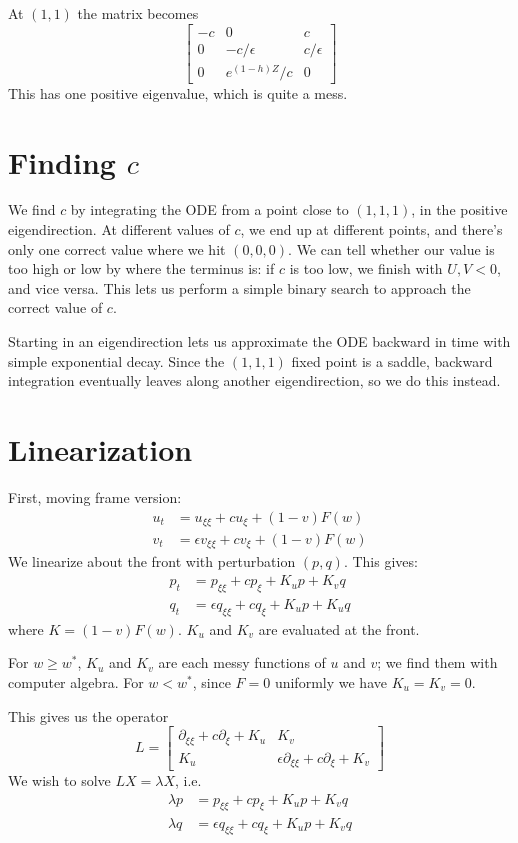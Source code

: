 \documentclass[10pt]{article}
\begin{document}
At $(1,1)$ the matrix becomes
\[
\begin{bmatrix}
-c & 0 & c \\
0 & -c/\epsilon & c/\epsilon \\
0 & e^{(1-h)Z}/c & 0
\end{bmatrix}
\]
This has one positive eigenvalue, which is quite a mess.


\section{Finding $c$}
We find $c$ by integrating the ODE from a point close to $(1,1,1)$, in the positive eigendirection.
At different values of $c$, we end up at different points, and there's only one correct value where we hit $(0,0,0)$.
We can tell whether our value is too high or low by where the terminus is: if $c$ is too low, we finish with $U,V < 0$, and vice versa.  This lets us perform a simple binary search to approach the correct value of $c$.

Starting in an eigendirection lets us approximate the ODE backward in time with simple exponential decay.
Since the $(1,1,1)$ fixed point is a saddle, backward integration eventually leaves along another eigendirection, so we do this instead.


\section{Linearization}
First, moving frame version:
\begin{align}
u_t &= u_{\xi\xi} + c u_\xi + (1-v)F(w) \\
v_t &= \epsilon v_{\xi\xi} + c v_\xi+ (1-v)F(w)
\end{align}
We linearize about the front with perturbation $(p,q)$.  This gives:
\begin{align}
p_t &= p_{\xi\xi} + c p_\xi + K_u p + K_v q \\
q_t &= \epsilon q_{\xi\xi} + c q_\xi+ K_u p + K_u q
\end{align}
where $K = (1-v)F(w)$.
$K_u$ and $K_v$ are evaluated at the front.

For $w \geq w^*$, $K_u$ and $K_v$ are each messy functions of $u$ and $v$; we find them with computer algebra.
For $w < w^*$, since $F = 0$ uniformly we have $K_u = K_v = 0$.

This gives us the operator
\[
L = \begin{bmatrix}
\partial_{\xi\xi} + c \partial_\xi + K_u  &  K_v  \\
K_u  &  \epsilon \partial_{\xi\xi} + c \partial_\xi + K_v
\end{bmatrix}
\]
We wish to solve $LX = \lambda X$, i.e.
\begin{align}
\lambda p &= p_{\xi\xi} + c p_\xi + K_u p + K_v q \\
\lambda q &= \epsilon q_{\xi\xi} + c q_\xi+ K_u p + K_v q
\end{align}
\end{document}
